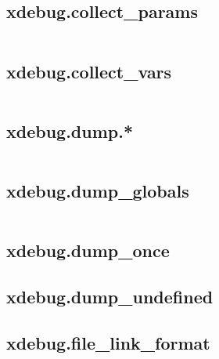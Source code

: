 \begin{lstlisting}[language=PHP]

\end{lstlisting}

\subsection{xdebug.collect\_params}




\begin{lstlisting}[language=PHP]

\end{lstlisting}

\subsection{xdebug.collect\_vars}


\begin{lstlisting}[language=PHP]

\end{lstlisting}

\subsection{xdebug.dump.*}


\begin{lstlisting}[language=PHP]

\end{lstlisting}


\subsection{xdebug.dump\_globals}


\begin{lstlisting}[language=PHP]

\end{lstlisting}


\subsection{xdebug.dump\_once}


\subsection{xdebug.dump\_undefined}


\subsection{xdebug.file\_link\_format}

